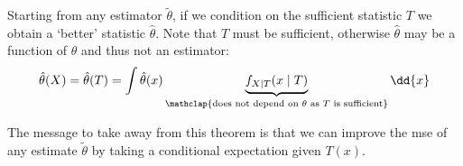 \begin{remark}
	Starting from any estimator $\widetilde \theta$, if we condition on the sufficient statistic $T$ we obtain a `better' statistic $\hat \theta$.
	Note that $T$ must be sufficient, otherwise $\hat \theta$ may be a function of $\theta$ and thus not an estimator:
	\begin{align*}
		\hat \theta(X) = \hat \theta(T) = \int \hat \theta(x) \underbrace{f_{X \mid T}(x \mid T)}_{\mathclap{\text{does not depend on } \theta \text{ as } T \text{ is sufficient}}} \dd{x}
	\end{align*}
\end{remark}

The message to take away from this theorem is that we can improve the mse of any estimate $\tilde \theta$ by taking a conditional expectation given $T(x)$.

